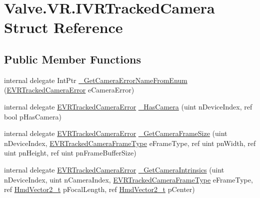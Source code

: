 \hypertarget{struct_valve_1_1_v_r_1_1_i_v_r_tracked_camera}{}\section{Valve.\+V\+R.\+I\+V\+R\+Tracked\+Camera Struct Reference}
\label{struct_valve_1_1_v_r_1_1_i_v_r_tracked_camera}
\subsection*{Public Member Functions}
\begin{DoxyCompactItemize}
\item 
internal delegate Int\+Ptr \mbox{\hyperlink{struct_valve_1_1_v_r_1_1_i_v_r_tracked_camera_a0bf8d42b5ed4c30eb09d04124dfb621e}{\+\_\+\+Get\+Camera\+Error\+Name\+From\+Enum}} (\mbox{\hyperlink{namespace_valve_1_1_v_r_ad0e012e846f5d93848783c044614cfd3}{E\+V\+R\+Tracked\+Camera\+Error}} e\+Camera\+Error)
\item 
internal delegate \mbox{\hyperlink{namespace_valve_1_1_v_r_ad0e012e846f5d93848783c044614cfd3}{E\+V\+R\+Tracked\+Camera\+Error}} \mbox{\hyperlink{struct_valve_1_1_v_r_1_1_i_v_r_tracked_camera_a4138984fea114155a7a9f4cd9344abcf}{\+\_\+\+Has\+Camera}} (uint n\+Device\+Index, ref bool p\+Has\+Camera)
\item 
internal delegate \mbox{\hyperlink{namespace_valve_1_1_v_r_ad0e012e846f5d93848783c044614cfd3}{E\+V\+R\+Tracked\+Camera\+Error}} \mbox{\hyperlink{struct_valve_1_1_v_r_1_1_i_v_r_tracked_camera_a7a7151ceb5ce18c098884b07ba847502}{\+\_\+\+Get\+Camera\+Frame\+Size}} (uint n\+Device\+Index, \mbox{\hyperlink{namespace_valve_1_1_v_r_a9962211bc3fe98c2683db188c12c9afd}{E\+V\+R\+Tracked\+Camera\+Frame\+Type}} e\+Frame\+Type, ref uint pn\+Width, ref uint pn\+Height, ref uint pn\+Frame\+Buffer\+Size)
\item 
internal delegate \mbox{\hyperlink{namespace_valve_1_1_v_r_ad0e012e846f5d93848783c044614cfd3}{E\+V\+R\+Tracked\+Camera\+Error}} \mbox{\hyperlink{struct_valve_1_1_v_r_1_1_i_v_r_tracked_camera_aacef66b75e9aea2e3f8e98c36f7f8c9a}{\+\_\+\+Get\+Camera\+Intrinsics}} (uint n\+Device\+Index, uint n\+Camera\+Index, \mbox{\hyperlink{namespace_valve_1_1_v_r_a9962211bc3fe98c2683db188c12c9afd}{E\+V\+R\+Tracked\+Camera\+Frame\+Type}} e\+Frame\+Type, ref \mbox{\hyperlink{struct_valve_1_1_v_r_1_1_hmd_vector2__t}{Hmd\+Vector2\+\_\+t}} p\+Focal\+Length, ref \mbox{\hyperlink{struct_valve_1_1_v_r_1_1_hmd_vector2__t}{Hmd\+Vector2\+\_\+t}} p\+Center)
\item 

\end{DoxyCompactItemize}
